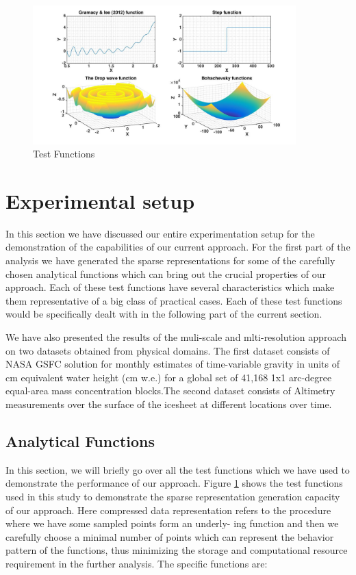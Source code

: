 \documentclass[procedia]{easychair}
\begin{document}
\begin{figure}[]  %
	\centering
	\includegraphics[width=4in]{plotfortest.jpg}
	\caption[Optional caption]{Test Functions}
	\label{fig1} %
\end{figure}


\section{Experimental setup}
In this section we have discussed our entire experimentation setup for the demonstration of the capabilities of our current approach. For the first part of the analysis we have generated the sparse representations for some of the carefully chosen analytical functions which can bring out the crucial properties of our approach. Each of these test functions have several characteristics which make them representative of a big class of practical cases. Each of these test functions would be specifically dealt with in the following part of the current section. 

We have also presented the results of the muli-scale and mlti-resolution approach on two datasets obtained from physical domains. The first dataset consists of NASA GSFC solution for monthly estimates of time-variable gravity in units of cm equivalent water height (cm w.e.) for a global set of 41,168 1x1 arc-degree equal-area mass concentration blocks.The  second dataset consists of Altimetry measurements over the surface of the icesheet at different locations over time. 

\subsection{Analytical Functions}

In this section, we will briefly go over all the test functions \cite{simulationlib} which we have used to demonstrate the performance of our approach. Figure \ref{fig1} shows the test functions used in this study to demonstrate the sparse representation generation capacity of our approach. Here compressed data representation refers to the procedure where we have some sampled points form an underly- ing function and then we carefully choose a minimal number of points which can represent the behavior pattern of the functions, thus minimizing the storage and computational resource requirement in the further analysis. The specific functions are:
 
\end{document}
